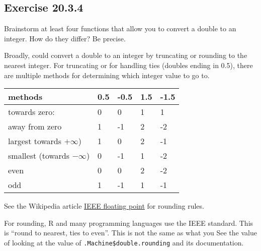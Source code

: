 \documentclass[]{book}
\newenvironment{Shaded}{\begin{snugshade}}{\end{snugshade}}
\newcommand{\CommentTok}[1]{\textcolor[rgb]{0.56,0.35,0.01}{\textit{#1}}}
\newcommand{\ControlFlowTok}[1]{\textcolor[rgb]{0.13,0.29,0.53}{\textbf{#1}}}
\newcommand{\DataTypeTok}[1]{\textcolor[rgb]{0.13,0.29,0.53}{#1}}
\newcommand{\DecValTok}[1]{\textcolor[rgb]{0.00,0.00,0.81}{#1}}
\newcommand{\FloatTok}[1]{\textcolor[rgb]{0.00,0.00,0.81}{#1}}
\newcommand{\KeywordTok}[1]{\textcolor[rgb]{0.13,0.29,0.53}{\textbf{#1}}}
\newcommand{\NormalTok}[1]{#1}
\newcommand{\OperatorTok}[1]{\textcolor[rgb]{0.81,0.36,0.00}{\textbf{#1}}}
\newcommand{\OtherTok}[1]{\textcolor[rgb]{0.56,0.35,0.01}{#1}}
\newcommand{\StringTok}[1]{\textcolor[rgb]{0.31,0.60,0.02}{#1}}
\theoremstyle{plain}
\theoremstyle{remark}
\begin{document}
\hypertarget{exercise-20.3.4}{%
\subsection*{\texorpdfstring{Exercise
{20.3.4}}{Exercise 20.3.4}}\label{exercise-20.3.4}}

Brainstorm at least four functions that allow you to convert a double to
an integer. How do they differ? Be precise.

Broadly, could convert a double to an integer by truncating or rounding
to the nearest integer. For truncating or for handling ties (doubles
ending in 0.5), there are multiple methods for determining which integer
value to go to.

\begin{longtable}[]{@{}lllll@{}}
\toprule
methods & 0.5 & -0.5 & 1.5 & -1.5\tabularnewline
\midrule
\endhead
towards zero: & 0 & 0 & 1 & 1\tabularnewline
away from zero & 1 & -1 & 2 & -2\tabularnewline
largest towards \(+\infty\)) & 1 & 0 & 2 & -1\tabularnewline
smallest (towards \(-\infty\)) & 0 & -1 & 1 & -2\tabularnewline
even & 0 & 0 & 2 & -2\tabularnewline
odd & 1 & -1 & 1 & -1\tabularnewline
\bottomrule
\end{longtable}

See the Wikipedia article
\href{https://en.wikipedia.org/wiki/IEEE_floating_point}{IEEE floating
point} for rounding rules.

For rounding, R and many programming languages use the IEEE standard.
This is ``round to nearest, ties to even''. This is not the same as what
you See the value of looking at the value of
\texttt{.Machine\$double.rounding} and its documentation.

\begin{Shaded}
\end{Shaded}
\end{document}
